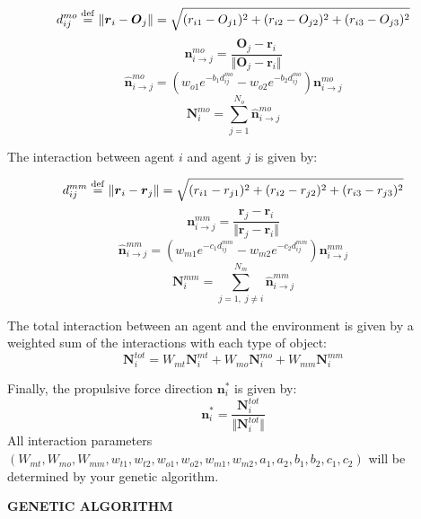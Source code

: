 \documentclass{article}
\begin{document}
\begin{equation}
    d^{mo}_{ij} \stackrel{\rm def}{=} \Vert \boldsymbol{r}_i - \boldsymbol{O}_j \Vert = \sqrt{(r_{i1} - O_{j1})^2 + (r_{i2} - O_{j2})^2 + (r_{i3} - O_{j3})^2}
\end{equation}
\begin{equation}
    \boldsymbol{n}_{i\to j}^{mo}  = \frac{\boldsymbol{O}_j - \boldsymbol{r}_i}{\Vert \boldsymbol{O}_j - \boldsymbol{r}_i \Vert}
\end{equation}
\begin{equation}\label{nMOhat}
    \boldsymbol{\hat{n}}_{i\to j}^{mo} = (w_{o1}e^{-b_1d^{mo}_{ij}} - w_{o2}e^{-b_2d^{mo}_{ij}})\boldsymbol{n}_{i\to j}^{mo}
\end{equation}
\begin{equation}
    \boldsymbol{N}_i^{mo} = \sum_{j = 1}^{N_o}\boldsymbol{\hat{n}}_{i\to j}^{mo}
\end{equation}   

The interaction between agent $i$ and agent $j$ is given by: 

\begin{equation}
    d^{mm}_{ij} \stackrel{\rm def}{=} \Vert \boldsymbol{r}_i - \boldsymbol{r}_j \Vert = \sqrt{(r_{i1} - r_{j1})^2 + (r_{i2} - r_{j2})^2 + (r_{i3} - r_{j3})^2}
\end{equation}
\begin{equation}\label{nMMhat}
    \boldsymbol{n}_{i\to j}^{mm} = \frac{\boldsymbol{r}_j - \boldsymbol{r}_i}{\Vert \boldsymbol{r}_j - \boldsymbol{r}_i \Vert}
\end{equation}
\begin{equation}
    \boldsymbol{\hat{n}}_{i\to j}^{mm} = (w_{m1}e^{-c_1d^{mm}_{ij}} - w_{m2}e^{-c_2d^{mm}_{ij}})\boldsymbol{n}_{i\to j}^{mm}
\end{equation}
\begin{equation}
    \boldsymbol{N}_i^{mm} = \sum_{j = 1, \;j \neq i}^{N_m}\boldsymbol{\hat{n}}_{i\to j}^{mm}
\end{equation}  

The total interaction between an agent and the environment is given by a weighted sum of the interactions with each type of object: 
\begin{equation}\label{Ntot}
\boldsymbol{N}_i^{tot} = W_{mt}\boldsymbol{N}_i^{mt} + W_{mo}\boldsymbol{N}_i^{mo} + W_{mm}\boldsymbol{N}_i^{mm}
\end{equation}

Finally, the propulsive force direction $\boldsymbol{n}^*_i$ is given by: 
\begin{equation}
    \boldsymbol{n}^*_i = \frac{\boldsymbol{N}_i^{tot}}{\Vert \boldsymbol{N}_i^{tot} \Vert} \label{prop_dir}
\end{equation}
All interaction parameters $
( W_{mt}, W_{mo}, W_{mm}, w_{t1}, w_{t2}, w_{o1}, w_{o2}, w_{m1}, w_{m2}, a_1, a_2, b_1, b_2,  c_1, c_2)$ will be determined by your genetic algorithm.
\newpage{}
\centerline{\bf GENETIC ALGORITHM}
\end{document}
